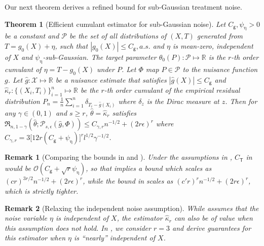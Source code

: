 \documentclass{article}
\def\eps{{\epsilon}}
\def\gO{{\mathcal{O}}}
\def\gP{{\mathcal{P}}}
\def\gX{{\mathcal{X}}}
\newcommand{\R}{\mathbb{R}}
\newtheorem{theorem}{Theorem}[section]
\newtheorem{remark}{Remark}[section]
\begin{document}
Our next theorem derives a refined bound for sub-Gaussian treatment noise.

\begin{theorem}[Efficient cumulant estimator for sub-Gaussian noise]
    \label{thm:estimating-cumulants}
    Let $C_{\mathsf{g}}, \psi_{\upeta}>0$ be a constant and $\gP$ be the set of all distributions of $(X,T)$ generated from $T=g_0(X)+\eta$, such that $|g_0(X)|\leq C_{\mathsf{g}}, a.s.$ and $\eta$ is mean-zero, independent of $X$ and $\psi_{\upeta}$-sub-Gaussian. The target parameter $\theta_0(P):\gP\mapsto\R$  is the $r$-th order cumulant of $\eta=T-g_0(X)$ under $P$. Let $\Phi$ map $P\in\gP$ to the nuisance function $g$. Let $\hat{g}:\gX\mapsto\R$ be a nuisance estimate that satisfies $|\hat{g}(X)|\leq C_{\mathsf{g}}$ and $\hat{\kappa}_r: \{(X_i,T_i)\}_{i=1}^n\mapsto\R$ be the $r$-th order cumulant of the empirical residual distribution $P_n=\frac{1}{n}\sum_{i=1}^n\delta_{T_i-\hat{g}(X_i)}$ where $\delta_z$ is the Dirac measure at $z$. Then for any $\gamma \in (0,1)$ and $s \geq r$, $\hat\theta=\hat{\kappa}_r$ satisfies $\mathfrak{R}_{n,1-\gamma}\left(\hat\theta; \gP_{s,\eps}(\hat{g},\Phi)\right) \leq C_{\gamma,r} n^{-1/2} + (2r\eps)^r$ where $C_{\gamma,r}=3\big[12r(C_{\mathsf g}+\psi_{\upeta})\big]^r l^{1/2}\gamma^{-1/2}$.
\end{theorem}

\begin{remark}[Comparing the bounds in  and ]
\label{remark:rate-comparison}
    Under the assumptions in , $C_{\mathsf{T}}$ in  would be $\gO(C_{\mathsf{g}}+\sqrt{r}\psi_{\upeta})$, so that  implies a bound which scales as $(cr)^{3r/2}n^{-1/2}+(2r\eps)^r$, while the bound in  scales as $(c'r)^{r}n^{-1/2}+(2r\eps)^r$, which is strictly tighter.
\end{remark}

\begin{remark}[Relaxing the independent noise assumption]
\label{remark:relax-independence}
    While  assumes that the noise variable $\eta$ is independent of $X$, the estimator $\hat{\kappa}_r$ %
    can also be of value when this assumption does not hold. In , we consider $r=3$ and derive guarantees for this estimator when $\eta$ is ``nearly'' independent of $X$.
\end{remark}
\end{document}
